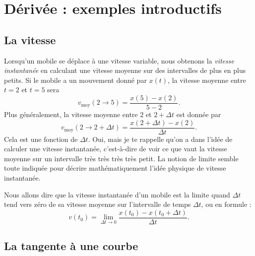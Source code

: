 \section{Dérivée : exemples introductifs}

\subsection{La vitesse}

Lorsqu'un mobile se déplace à une vitesse variable, nous obtenons la \emph{vitesse instantanée} en calculant une vitesse moyenne sur des intervalles de plus en plus petits. Si le mobile a un mouvement donné par $x(t)$, la vitesse moyenne entre $t=2$ et $t=5$ sera
\[
  v_{\text{moy}}(2\to 5)=\frac{ x(5)-x(2) }{ 5-2 }.
\]
Plus généralement, la vitesse moyenne entre $2$ et $2+\Delta t$ est donnée par
\[
  v_{\text{moy}}(2\to 2+\Delta t)=\frac{ x(2+\Delta t)-x(2) }{ \Delta t }.
\]
Cela est une fonction de $\Delta t$. Oui, mais je te rappelle qu'on a dans l'idée de calculer une vitesse instantanée, c'est-à-dire de voir ce que vaut la vitesse moyenne sur un intervalle très {\small très} {\footnotesize très} {\scriptsize très} {\tiny petit}. La notion de limite semble toute indiquée pour décrire mathématiquement l'idée physique de vitesse instantanée.

Nous allons dire que la vitesse instantanée d'un mobile est la limite quand $\Delta t$ tend vers zéro de sa vitesse moyenne sur l'intervalle de temps $\Delta t$, ou en formule :
\begin{equation}		\label{Eqvinstlimite}
	v(t_0)=\lim_{\Delta t\to 0}\frac{ x(t_0)-x(t_0+\Delta t) }{ \Delta t }.
\end{equation}

\subsection{La tangente à une courbe}

